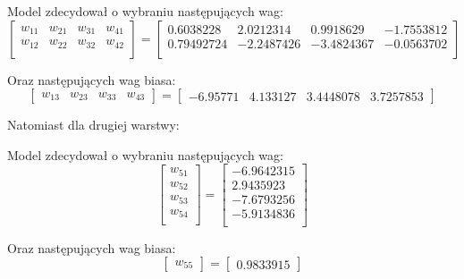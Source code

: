 \documentclass{article}
\begin{document}
Model zdecydował o wybraniu następujących wag:
\begin{equation*}
    \begin{bmatrix}
        w_{11} & w_{21} & w_{31} & w_{41} \\
        w_{12} & w_{22} & w_{32} & w_{42} \\
    \end{bmatrix}
    =
    \begin{bmatrix}
        0.6038228  & 2.0212314 &  0.9918629 & -1.7553812 \\
        0.79492724 & -2.2487426 & -3.4824367 & -0.0563702 \\
    \end{bmatrix}
\end{equation*}

Oraz następujących wag biasa:
\begin{equation*}
    \begin{bmatrix}
        w_{13} & w_{23} & w_{33} & w_{43}
    \end{bmatrix}
    =
    \begin{bmatrix}
        -6.95771  &  4.133127 &  3.4448078 & 3.7257853
    \end{bmatrix}
\end{equation*}

Natomiast dla drugiej warstwy:

Model zdecydował o wybraniu następujących wag:
\begin{equation*}
    \begin{bmatrix}
        w_{51} \\
        w_{52} \\
        w_{53} \\
        w_{54} \\
    \end{bmatrix}
    =
    \begin{bmatrix}
        -6.9642315 \\
         2.9435923 \\
        -7.6793256 \\
        -5.9134836 \\
    \end{bmatrix}
\end{equation*}

Oraz następujących wag biasa:
\begin{equation*}
    \begin{bmatrix}
        w_{55}
    \end{bmatrix}
    =
    \begin{bmatrix}
        0.9833915
    \end{bmatrix}
\end{equation*}
\end{document}

